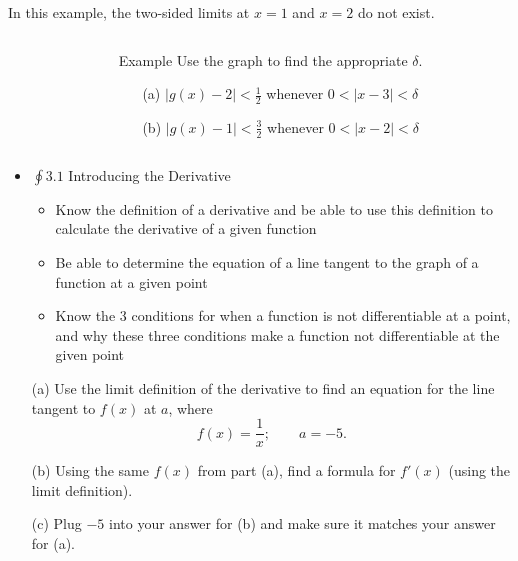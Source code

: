 \documentclass[14pt]{beamer}
\begin{document}
\begin{frame}
\frametitle{}
\footnotesize
In this example, the two-sided limits at $x=1$ and $x=2$ do not exist.
\begin{columns}[T]
\begin{column}{.5\textwidth}
\begin{block}
\end{block}
\end{column}
\begin{column}{.5\textwidth}
\begin{block}
{Example}
\footnotesize
Use the graph to find the appropriate $\delta$.
\begin{itemize}
\item[(a)] $|g(x)-2|<\frac{1}{2}$ whenever $0<|x-3|<\delta$

\vspace{0.5pc}
\item[(b)] $|g(x)-1|<\frac{3}{2}$ whenever $0<|x-2|<\delta$
\end{itemize}
\end{block}
\end{column}
\end{columns}
\end{frame}

\begin{frame}
\begin{itemize}
\item $\oint 3.1$ Introducing the Derivative
	\begin{itemize}
	\item Know the definition of a derivative and be able to use this definition to calculate the derivative of a given function
	\item Be able to determine the equation of a line tangent to the graph of a function at a given point
	\item Know the 3 conditions for when a function is not differentiable at a point, and why these three conditions make a function not differentiable at the given point
	\end{itemize}
\end{itemize}
\end{frame}

\begin{frame}
\begin{ex}
	\begin{itemize}
	\item[(a)] Use the limit definition of the derivative to find an equation for the line tangent to $f(x)$ at $a$, where
	\[f(x)=\frac{1}{x};\qquad a=-5.\]
	
	\vspace{0.5pc}
	\item[(b)] Using the same $f(x)$ from part (a), find a formula for $f'(x)$ (using the limit definition).
	
	\vspace{0.5pc}
	\item[(c)] Plug $-5$ into your answer for (b) and make sure it matches your answer for (a).
	\end{itemize}
\end{ex}
\end{frame}
\end{document}

